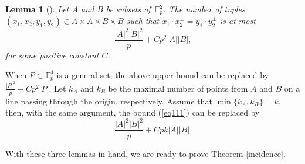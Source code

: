 \documentclass[11pt]{article}
\newtheorem{lemma}[theorem]{Lemma}
\begin{document}
\begin{lemma}[\cite{P.V.17}]\label{lmmay3}
    Let $A$ and $B$ be subsets of $\, \mathbb{F}_p^2$. The number of tuples $(x_1, x_2, y_1, y_2)\in A\times A\times B\times B$ such that $x_1\cdot x_2^{\perp}=y_1\cdot y_2^{\perp}$ is at most 
    \begin{equation}\label{eq111}\frac{|A|^2|B|^2}{p}+Cp^2|A||B|,\end{equation}
    for some positive constant $C$. 
\end{lemma}
When $P\subset \mathbb{F}_p^4$ is a general set, the above upper bound can be replaced by $\frac{|P|^2}{p}+Cp^2|P|$. Let $k_A$ and  $k_B$ be the maximal number of points from $A$ and $B$ on a line passing through the origin, respectively. Assume that $\min\{k_A, k_B\}=k$, then, with the same argument, the bound (\ref{eq111}) can be replaced by
    \[\frac{|A|^2|B|^2}{p}+Cpk|A||B|.\]


With these three lemmas in hand, we are ready to prove Theorem \ref{incidence}.
\end{document}
